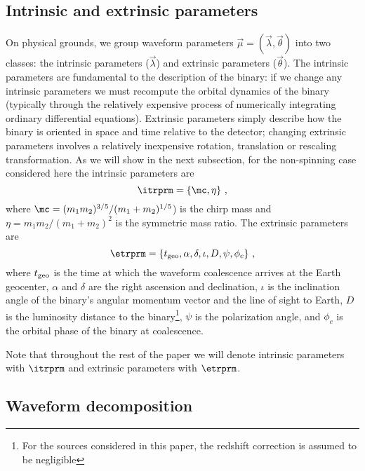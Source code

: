 \subsection{Intrinsic and extrinsic parameters}

On physical grounds, we group waveform parameters $\vec{\mu}=(\vec{\lambda},\vec{\theta})$ into two classes: the
intrinsic parameters ($\vec{\lambda}$) and extrinsic parameters ($\vec{\theta}$). 
The intrinsic parameters are fundamental to the description of the binary: if we change any intrinsic
parameters we must recompute the orbital dynamics of the binary (typically through the relatively expensive process
of numerically integrating ordinary differential equations). Extrinsic parameters simply describe how the
binary is oriented in space and time relative to the detector; changing extrinsic parameters involves a 
relatively inexpensive rotation, translation or rescaling transformation. As we will show in the next subsection, 
for the non-spinning case considered here the intrinsic parameters are
\begin{equation} \label{eq:intrinsic}
\itrprm=\{\mc,\eta\}\ ,
\end{equation}
where $\mc = (m_1m_2)^{3/5}/(m_1+m_2)^{1/5}$) is the chirp mass and 
$\eta = m_1m_2/(m_1+m_2)^2$ is the symmetric mass ratio.
The extrinsic parameters are
\begin{equation} \label{eq:extrinsic}
\etrprm=\{t_{\rm geo},\alpha,\delta,\iota,D,\psi,\phi_c\}\ ,
\end{equation}
where $t_{\rm geo}$ is the time at which the waveform coalescence arrives at the Earth geocenter,
$\alpha$ and $\delta$ are the right ascension and declination, 
$\iota$ is the inclination angle of the binary's angular momentum vector and the line of sight to Earth, 
$D$ is the luminosity distance to the binary\footnote{For the sources considered in this paper, 
	the redshift correction is assumed to be negligible}, 
$\psi$ is the polarization angle, and $\phi_c$ is the orbital phase of the binary at coalescence.

Note that throughout the rest of the paper we will denote intrinsic parameters with $\itrprm$ 
and extrinsic parameters with $\etrprm$.

\subsection{Waveform decomposition}

